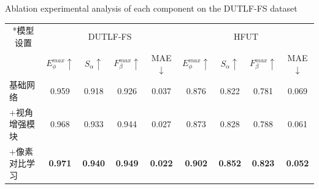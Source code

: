 \begin{table}[!ht]
	{Ablation experimental analysis of each component on the DUTLF-FS dataset}
	\centering
	\label{chpt4:tab:abl_tot}
		\begin{tabular}{lcccccccc}
			\toprule[2pt]  %
			
			\multicolumn{1}{c}{ \multirow{2}*{模型设置}}	& \multicolumn{4}{c}{DUTLF-FS} & \multicolumn{4}{c}{HFUT} \\ 
			
			
			\cmidrule(r){2-5} \cmidrule(r){6-9} 
			
			& $E_{\phi}^{max}\uparrow$ & $S_{\alpha }\uparrow $ & $F_{\beta}^{max}\uparrow$ & MAE$\downarrow$ 
			& $E_{\phi}^{max}\uparrow$ & $S_{\alpha }\uparrow $ & $F_{\beta}^{max}\uparrow$ & MAE$\downarrow$
			\\
			
			\midrule
			
			
			基础网络     & 0.959 & 0.918 & 0.926 & 0.037 & 0.876 & 0.822 & 0.781 & 0.069   \\
			+视角增强模块 & 0.968 & 0.933 & 0.944 & 0.027 & 0.873 & 0.828 & 0.788 & 0.061   \\
			
			
			
			+像素对比学习
			& \textbf{0.971} & \textbf{0.940} & \textbf{0.949} & \textbf{0.022} 
			& \textbf{0.902} & \textbf{0.852} & \textbf{0.823} & \textbf{0.052}  
			\\
			
			
			\bottomrule[2pt]
		\end{tabular}
\end{table}





